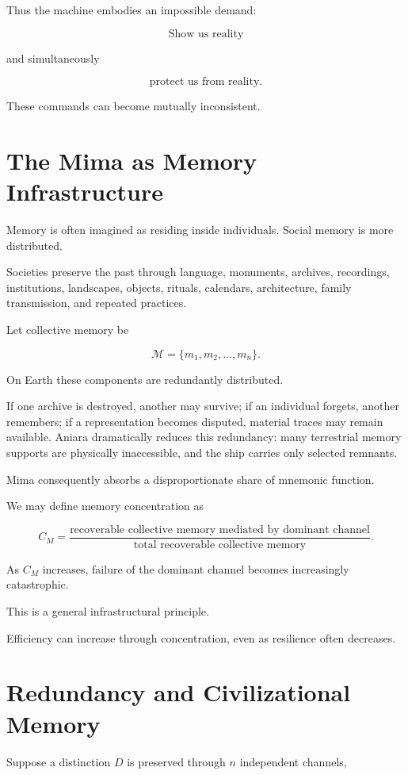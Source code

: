 \documentclass[11pt,oneside]{book}
\theoremstyle{definition}
\theoremstyle{remark}
\begin{document}
Thus the machine embodies an impossible demand:

\[
\text{Show us reality}
\]

and simultaneously

\[
\text{protect us from reality}.
\]

These commands can become mutually inconsistent.

\section{The Mima as Memory Infrastructure}

Memory is often imagined as residing inside individuals. Social memory is more distributed.

Societies preserve the past through language, monuments, archives, recordings, institutions, landscapes, objects, rituals, calendars, architecture, family transmission, and repeated practices.

Let collective memory be

\[
\mathcal M
=
\{
m_1,m_2,\ldots,m_n
\}.
\]

On Earth these components are redundantly distributed.

If one archive is destroyed, another may survive; if an individual forgets, another remembers; if a representation becomes disputed, material traces may remain available. Aniara dramatically reduces this redundancy: many terrestrial memory supports are physically inaccessible, and the ship carries only selected remnants.

Mima consequently absorbs a disproportionate share of mnemonic function.

We may define memory concentration as

\[
C_M
=
\frac{
\text{recoverable collective memory mediated by dominant channel}
}{
\text{total recoverable collective memory}
}.
\]

As \(C_M\) increases, failure of the dominant channel becomes increasingly catastrophic.

This is a general infrastructural principle.

Efficiency can increase through concentration, even as resilience often decreases.

\section{Redundancy and Civilizational Memory}

Suppose a distinction \(D\) is preserved through \(n\) independent channels,
\end{document}
